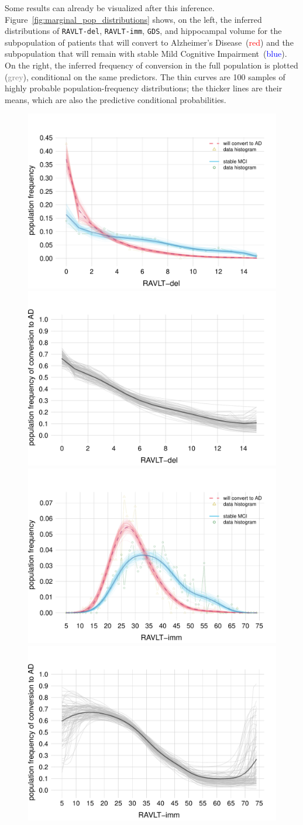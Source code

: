 \documentclass[utf8]{FrontiersinHarvard} %
\renewcommand*{\|}[1][]{\nonscript\:#1\vert\nonscript\:\mathopen{}}
\newcommand*{\gds}{\texttt{GDS}}
\newcommand*{\ravltimm}{\texttt{RAVLT-imm}}
\newcommand*{\ravltdel}{\texttt{RAVLT-del}}
\newcommand*{\ad}{Alzheimer's Disease}
\newcommand*{\mci}{Mild Cognitive Impairment}
\begin{document}
Some results can already be visualized after this inference. Figure~\ref{fig:marginal_pop_distributions} shows, on the left, the inferred distributions of \ravltdel, \ravltimm, \gds, and hippocampal volume for the subpopulation of patients that will convert to \ad\ (\textcolor{red}{red}) and the subpopulation that will remain with stable \mci\ (\textcolor{blue}{blue}). On the right, the inferred frequency of conversion in the full population is plotted (\textcolor{grey}{grey}), conditional on the same predictors. The thin curves are 100 samples of highly probable population-frequency distributions; the thicker lines are their means, which are also the predictive conditional probabilities.
\begin{figure}[!t]
\centering%
\includegraphics[width=0.43\linewidth]{population_distr_scat_RAVLT-del.pdf}%
\qquad%
\includegraphics[width=0.43\linewidth]{prob_conversion_RAVLT-del.pdf}%
\\
\includegraphics[width=0.43\linewidth]{population_distr_scat_RAVLT-imm.pdf}%
\qquad%
\includegraphics[width=0.43\linewidth]{prob_conversion_RAVLT-imm.pdf}%

\end{figure}
\end{document}

